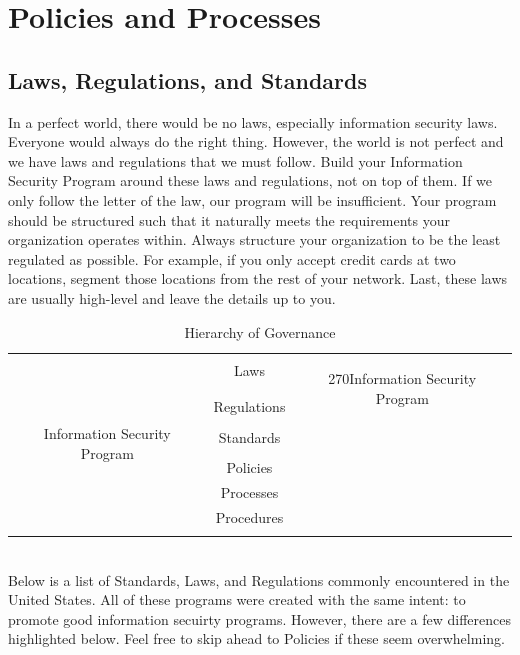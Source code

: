 \section{Policies and Processes}\label{sec:"Policies and Processes"}
\subsection{Laws, Regulations, and Standards}
In a perfect world, there would be no laws, especially information security laws. Everyone would always do the right thing. However, the world is not perfect and we have laws and regulations that we must follow. Build your Information Security Program around these laws and regulations, not on top of them. If we only follow the letter of the law, our program will be insufficient. Your program should be structured such that it naturally meets the requirements your organization operates within. Always structure your organization to be the least regulated as possible. For example, if you only accept credit cards at two locations, segment those locations from the rest of your network. Last, these laws are usually high-level and leave the details up to you.
\begin{table}[ht]\begin{center}\begin{tabular}{|c|c|c|}\hline
\multirow{12}{.15in}{\begin{turn}{90}Information Security Program\end{turn}} &  &\multirow{6}{.15in}{\begin{turn}{270}Information Security Program\end{turn}} \\
& Laws &\\
& & \\& & \\
& Regulations &\\
& & \\
& Standards & \\
& & \\
& Policies  &\\
& Processes  &\\
& Procedures &\\
& &\\\hline
\end{tabular}\caption{Hierarchy of Governance}\end{center}\end{table}\\
Below is a list of Standards, Laws, and Regulations commonly encountered in the United States. All of these programs were created with the same intent: to promote good information secuirty programs. However, there are a few differences highlighted below.
Feel free to skip ahead to Policies if these seem overwhelming.\\\\
